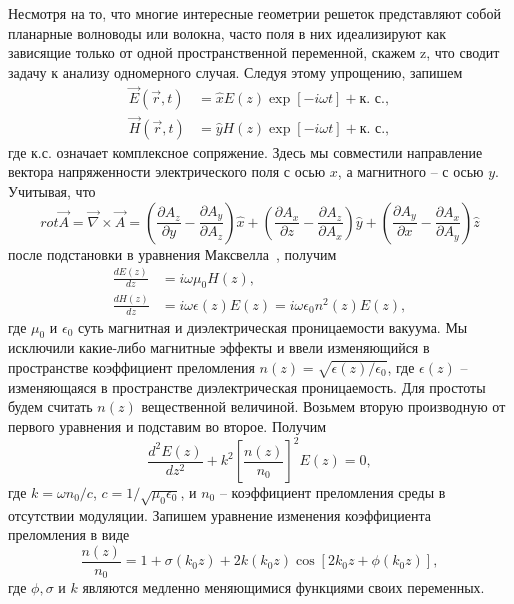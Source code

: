 Несмотря на то, что многие интересные геометрии решеток представляют собой планарные волноводы или волокна, часто поля в них идеализируют как зависящие только от одной пространственной переменной, скажем z, что сводит задачу к анализу одномерного случая. Следуя этому упрощению, запишем
\begin{equation}\label{eq1.21}
\begin{split}
    \vec{E}(\vec{r},t)&=\hat{x}E(z)\exp[-i\omega t] + \text{к. с.}, \\
    \vec{H}(\vec{r},t)&=\hat{y}H(z)\exp[-i\omega t] + \text{к. с.},
\end{split}
\end{equation}
где к.с. означает комплексное сопряжение. Здесь мы совместили направление вектора напряженности электрического поля с осью $x$, а магнитного – с осью $y$. Учитывая, что
$$
    rot \vec{A}=\overrightarrow{\nabla} \times \vec{A}=\left(\frac{\partial A_z}{\partial y}-\frac{\partial A_y}{\partial A_z}\right)\hat{x}+\left(\frac{\partial A_x}{\partial z}-\frac{\partial A_z}{\partial A_x}\right)\hat{y}+\left(\frac{\partial A_y}{\partial x}-\frac{\partial A_x}{\partial A_y}\right)\hat{z}
$$
после подстановки в уравнения Максвелла~\cite{Love}, получим
\begin{equation}\label{eq1.22}
\begin{split}
    \frac{dE(z)}{dz}&=i\omega\mu_0 H(z), \\
    \frac{dH(z)}{dz}&=i\omega\epsilon(z)E(z)=i\omega\epsilon_0 n^2(z)E(z),
\end{split}
\end{equation}
где $\mu_0$ и $\epsilon_0$ суть магнитная и диэлектрическая проницаемости вакуума. Мы исключили какие-либо магнитные эффекты и ввели изменяющийся в пространстве коэффициент преломления $n(z)=\sqrt{\epsilon(z)/\epsilon_0}$, где $\epsilon(z)$ – изменяющаяся в пространстве диэлектрическая проницаемость. Для простоты будем считать $n(z)$ вещественной величиной. Возьмем вторую производную от первого уравнения и подставим во второе. Получим
\begin{equation}\label{eq1.23}
    \frac{d^2 E(z)}{dz^2}+k^2\left[\frac{n(z)}{n_0}\right]^2 E(z)=0,
\end{equation}
где $k=\omega n_0/c$, $c=1/\sqrt{\mu_0\epsilon_0}$, и $n_0$ – коэффициент преломления среды в отсутствии модуляции. Запишем уравнение изменения коэффициента преломления в виде
\begin{equation}\label{eq1.24}
    \frac{n(z)}{n_0} = 1 + \sigma(k_0 z)+2k(k_0 z)\cos[2 k_0 z + \phi(k_0 z)],
\end{equation}
где $\phi, \sigma$ и $k$ являются медленно меняющимися функциями своих переменных.

